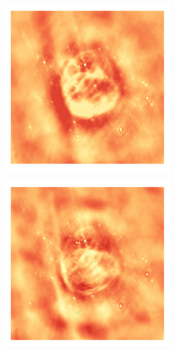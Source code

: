\begin{figure}[h]
	\begin{subfigure}[b]{0.3\linewidth}
		\includegraphics[width=\linewidth, trim={18px 19px 18px 18px}, clip]{./chapters/05.results/g55/clean_residual.png}
	\end{subfigure}
	\begin{subfigure}[b]{0.3\linewidth}
		\includegraphics[width=\linewidth, trim={18px 19px 18px 18px}, clip]{./chapters/05.results/g55/starlets1_residual.png}

\end{subfigure}
\end{figure}
